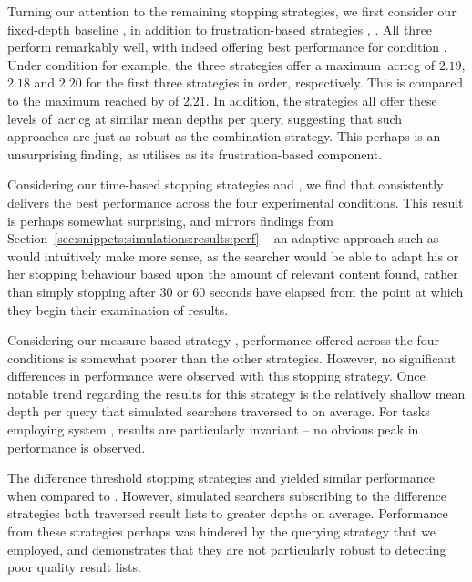 Turning our attention to the remaining stopping strategies, we first consider our fixed-depth baseline , in addition to frustration-based strategies , . All three perform remarkably well, with  indeed offering best performance for condition . Under condition  for example, the three strategies offer a maximum~\gls{acr:cg} of $2.19$, $2.18$ and $2.20$ for the first three strategies in order, respectively. This is compared to the maximum reached by  of $2.21$. In addition, the strategies all offer these levels of~\gls{acr:cg} at similar mean depths per query, suggesting that such approaches are just as robust as the combination strategy. This perhaps is an unsurprising finding, as  utilises  as its frustration-based component.

Considering our time-based stopping strategies  and , we find that  consistently delivers the best performance across the four experimental conditions. This result is perhaps somewhat surprising, and mirrors findings from Section~\ref{sec:snippets:simulations:results:perf} -- an adaptive approach such as  would intuitively make more sense, as the searcher would be able to adapt his or her stopping behaviour based upon the amount of relevant content found, rather than simply stopping after $30$ or $60$ seconds have elapsed from the point at which they begin their examination of results.

Considering our measure-based strategy , performance offered across the four conditions is somewhat poorer than the other strategies. However, no significant differences in performance were observed with this stopping strategy. Once notable trend regarding the results for this strategy is the relatively shallow mean depth per query that simulated searchers traversed to on average. For tasks employing system , results are particularly invariant -- no obvious peak in performance is observed.

The difference threshold stopping strategies  and  yielded similar performance when compared to . However, simulated searchers subscribing to the difference strategies both traversed result lists to greater depths on average. Performance from these strategies perhaps was hindered by the querying strategy that we employed, and demonstrates that they are not particularly robust to detecting poor quality result lists.

